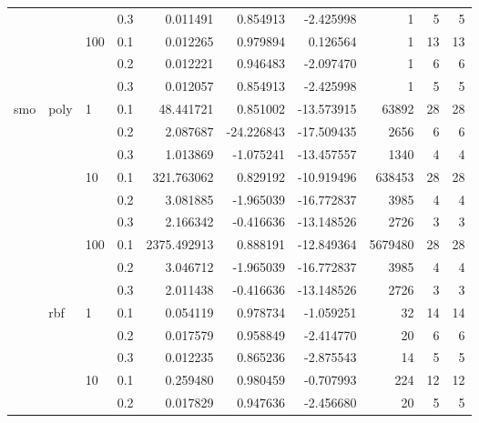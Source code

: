 \begin{table}[h!]
\begin{tabular}{llllrrrrrr}
       &     &     & 0.3 &     0.011491 &   0.854913 &  -2.425998 &         1 &           5 &         5 \\
       &     & 100 & 0.1 &     0.012265 &   0.979894 &   0.126564 &         1 &          13 &        13 \\
       &     &     & 0.2 &     0.012221 &   0.946483 &  -2.097470 &         1 &           6 &         6 \\
       &     &     & 0.3 &     0.012057 &   0.854913 &  -2.425998 &         1 &           5 &         5 \\
smo & poly & 1   & 0.1 &    48.441721 &   0.851002 & -13.573915 &     63892 &          28 &        28 \\
       &     &     & 0.2 &     2.087687 & -24.226843 & -17.509435 &      2656 &           6 &         6 \\
       &     &     & 0.3 &     1.013869 &  -1.075241 & -13.457557 &      1340 &           4 &         4 \\
       &     & 10  & 0.1 &   321.763062 &   0.829192 & -10.919496 &    638453 &          28 &        28 \\
       &     &     & 0.2 &     3.081885 &  -1.965039 & -16.772837 &      3985 &           4 &         4 \\
       &     &     & 0.3 &     2.166342 &  -0.416636 & -13.148526 &      2726 &           3 &         3 \\
       &     & 100 & 0.1 &  2375.492913 &   0.888191 & -12.849364 &   5679480 &          28 &        28 \\
       &     &     & 0.2 &     3.046712 &  -1.965039 & -16.772837 &      3985 &           4 &         4 \\
       &     &     & 0.3 &     2.011438 &  -0.416636 & -13.148526 &      2726 &           3 &         3 \\
       & rbf & 1   & 0.1 &     0.054119 &   0.978734 &  -1.059251 &        32 &          14 &        14 \\
       &     &     & 0.2 &     0.017579 &   0.958849 &  -2.414770 &        20 &           6 &         6 \\
       &     &     & 0.3 &     0.012235 &   0.865236 &  -2.875543 &        14 &           5 &         5 \\
       &     & 10  & 0.1 &     0.259480 &   0.980459 &  -0.707993 &       224 &          12 &        12 \\
       &     &     & 0.2 &     0.017829 &   0.947636 &  -2.456680 &        20 &           5 &         5 \\

\end{tabular}
\end{table}
